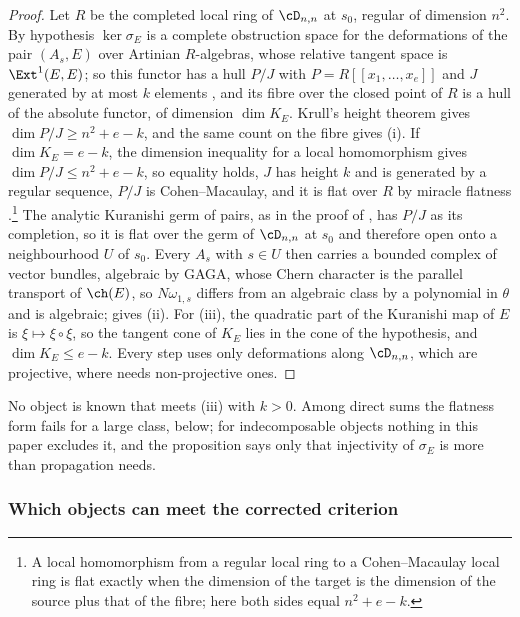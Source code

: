 \begin{proof}
Let $R$ be the completed local ring of $\cD_{n,n}$ at $s_{0}$, regular of
dimension $n^{2}$. By hypothesis $\ker\sigma_{E}$ is a complete obstruction
space for the deformations of the pair $(A_{s},E)$ over Artinian $R$-algebras,
whose relative tangent space is $\Ext^{1}(E,E)$; so this functor has a hull
$P/J$ with $P=R[[x_{1},\dots,x_{e}]]$ and $J$ generated by at most $k$
elements \cite{FM98}, and its fibre over the closed point of $R$ is a hull of
the absolute functor, of dimension $\dim K_{E}$. Krull's height theorem gives
$\dim P/J\ge n^{2}+e-k$, and the same count on the fibre gives (i). If
$\dim K_{E}=e-k$, the dimension inequality for a local homomorphism
\cite[Theorem~15.1]{Mat86} gives $\dim P/J\le n^{2}+e-k$, so equality holds, $J$
has height $k$ and is generated by a regular sequence, $P/J$ is
Cohen--Macaulay, and it is flat over $R$ by miracle flatness
\cite[Theorem~23.1]{Mat86}.\footnote{A local homomorphism from a regular local
ring to a Cohen--Macaulay local ring is flat exactly when the dimension of the
target is the dimension of the source plus that of the fibre; here both sides
equal $n^{2}+e-k$.} The analytic Kuranishi germ of pairs, as in the
proof of , has $P/J$ as its completion, so it is flat over
the germ of $\cD_{n,n}$ at $s_{0}$ and therefore open onto a neighbourhood
$U$ of $s_{0}$. Every $A_{s}$ with $s\in U$ then carries a bounded complex of
vector bundles, algebraic by GAGA, whose Chern character is the parallel
transport of $\ch(E)$, so $N\omega_{1,s}$ differs from an algebraic class by a
polynomial in $\theta$ and is algebraic;  gives (ii).
For (iii), the quadratic part of the Kuranishi map of $E$ is
$\xi\mapsto\xi\circ\xi$, so the tangent cone of $K_{E}$ lies in the cone of the
hypothesis, and $\dim K_{E}\le e-k$. Every step uses only deformations along
$\cD_{n,n}$, which are projective, where  needs
non-projective ones.
\end{proof}

No object is known that meets (iii) with $k>0$. Among direct sums the
flatness form fails for a large class,  below; for
indecomposable objects nothing in this paper excludes it, and the proposition
says only that injectivity of $\sigma_{E}$ is more than propagation needs.

\subsubsection*{Which objects can meet the corrected criterion}

